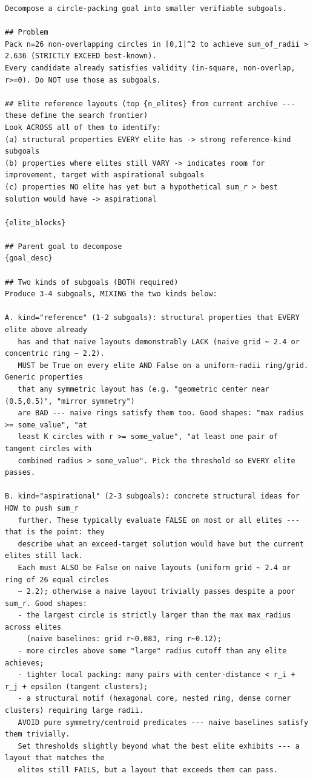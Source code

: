 \documentclass{llmxive}
\begin{document}
\begin{ttcolorbox}
\begin{lstlisting}[style=prompt]
Decompose a circle-packing goal into smaller verifiable subgoals.

## Problem
Pack n=26 non-overlapping circles in [0,1]^2 to achieve sum_of_radii > 2.636 (STRICTLY EXCEED best-known).
Every candidate already satisfies validity (in-square, non-overlap, r>=0). Do NOT use those as subgoals.

## Elite reference layouts (top {n_elites} from current archive --- these define the search frontier)
Look ACROSS all of them to identify:
(a) structural properties EVERY elite has -> strong reference-kind subgoals
(b) properties where elites still VARY -> indicates room for improvement, target with aspirational subgoals
(c) properties NO elite has yet but a hypothetical sum_r > best solution would have -> aspirational

{elite_blocks}

## Parent goal to decompose
{goal_desc}

## Two kinds of subgoals (BOTH required)
Produce 3-4 subgoals, MIXING the two kinds below:

A. kind="reference" (1-2 subgoals): structural properties that EVERY elite above already
   has and that naive layouts demonstrably LACK (naive grid ~ 2.4 or concentric ring ~ 2.2).
   MUST be True on every elite AND False on a uniform-radii ring/grid. Generic properties
   that any symmetric layout has (e.g. "geometric center near (0.5,0.5)", "mirror symmetry")
   are BAD --- naive rings satisfy them too. Good shapes: "max radius >= some_value", "at
   least K circles with r >= some_value", "at least one pair of tangent circles with
   combined radius > some_value". Pick the threshold so EVERY elite passes.

B. kind="aspirational" (2-3 subgoals): concrete structural ideas for HOW to push sum_r
   further. These typically evaluate FALSE on most or all elites --- that is the point: they
   describe what an exceed-target solution would have but the current elites still lack.
   Each must ALSO be False on naive layouts (uniform grid ~ 2.4 or ring of 26 equal circles
   ~ 2.2); otherwise a naive layout trivially passes despite a poor sum_r. Good shapes:
   - the largest circle is strictly larger than the max max_radius across elites
     (naive baselines: grid r~0.083, ring r~0.12);
   - more circles above some "large" radius cutoff than any elite achieves;
   - tighter local packing: many pairs with center-distance < r_i + r_j + epsilon (tangent clusters);
   - a structural motif (hexagonal core, nested ring, dense corner clusters) requiring large radii.
   AVOID pure symmetry/centroid predicates --- naive baselines satisfy them trivially.
   Set thresholds slightly beyond what the best elite exhibits --- a layout that matches the
   elites still FAILS, but a layout that exceeds them can pass.


\end{lstlisting}
\end{ttcolorbox}
\end{document}
